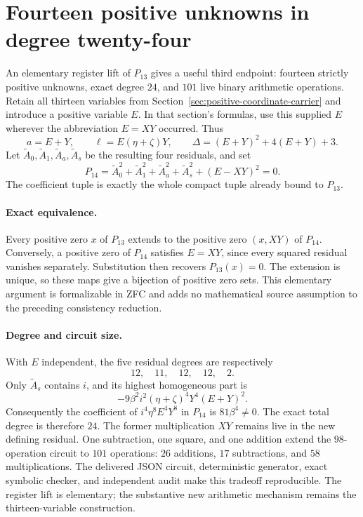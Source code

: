 \section{Fourteen positive unknowns in degree twenty-four}
\label{sec:positive14-degree24}

An elementary register lift of $P_{13}$ gives a useful third endpoint:
fourteen strictly positive unknowns, exact degree $24$, and $101$ live
binary arithmetic operations.  Retain all thirteen variables from
Section~\ref{sec:positive-coordinate-carrier} and introduce a positive
variable $E$.  In that section's formulas, use this supplied $E$ wherever
the abbreviation $E=XY$ occurred.  Thus
\[
 a=E+Y,\qquad \ell=E(\eta+\zeta)Y,
 \qquad \Delta=(E+Y)^2+4(E+Y)+3.
\]
Let $\widetilde A_0,\widetilde A_1,\widetilde A_a,\widetilde A_s$ be the
resulting four residuals, and set
\begin{equation}
 \boxed{\;P_{14}=\widetilde A_0^2+\widetilde A_1^2+
   \widetilde A_a^2+\widetilde A_s^2+(E-XY)^2=0.\;}
 \label{eq:positive14-degree24}
\end{equation}
The coefficient tuple is exactly the whole compact tuple already bound to
$P_{13}$.

\paragraph{Exact equivalence.}
Every positive zero $x$ of $P_{13}$ extends to the positive zero $(x,XY)$
of $P_{14}$.  Conversely, a positive zero of $P_{14}$ satisfies $E=XY$,
since every squared residual vanishes separately.  Substitution then
recovers $P_{13}(x)=0$.  The extension is unique, so these maps give a
bijection of positive zero sets.  This elementary argument is formalizable
in ZFC and adds no mathematical source assumption to the preceding
consistency reduction.

\paragraph{Degree and circuit size.}
With $E$ independent, the five residual degrees are respectively
\[
 12,\quad11,\quad12,\quad12,\quad2.
\]
Only $\widetilde A_s$ contains $i$, and its highest homogeneous part is
\[
 -9\beta^2 i^2(\eta+\zeta)^4Y^4(E+Y)^2.
\]
Consequently the coefficient of $i^4\eta^8E^4Y^8$ in $P_{14}$ is
$81\beta^4\ne0$.  The exact total degree is therefore $24$.
The former multiplication $XY$ remains live in the new defining residual.
One subtraction, one square, and one addition extend the $98$-operation
circuit to $101$ operations: $26$ additions, $17$ subtractions, and $58$
multiplications.  The delivered JSON circuit, deterministic generator,
exact symbolic checker, and independent audit make this tradeoff
reproducible.  The register lift is elementary; the substantive new
arithmetic mechanism remains the thirteen-variable construction.
